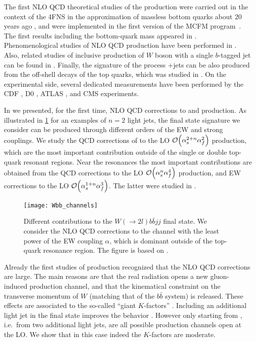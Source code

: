 The first NLO QCD theoretical studies of the \Wbb{} production were carried out in 
the context of the 4FNS in the approximation of massless bottom quarks about 20 years ago \cite{Bern:1997sc,Ellis:1998fv},
and were implemented in the first version of the MCFM program~\cite{mcfm7}.
The first results including the bottom-quark mass appeared in \cite{FebresCordero:2006sj,Cordero:2009kv,Badger:2010mg,Oleari:2011ey}.
Phenomenological studies of NLO QCD \Wbbnj[1]{} production have been performed in \cite{Luisoni:2015mpa}.
Also, related studies of inclusive production of $W$ boson with a single $b$-tagged jet
can be found in \cite{Campbell:2006cu,Campbell:2008hh,Caola:2011pz}.
Finally, the signature of the process \Wbb{}+jets can be also produced from
the off-shell decays of the top quarks, which was studied in \cite{Denner:2017kzu}.
On the experimental side, several dedicated measurements
have been performed by the CDF \cite{Aaltonen:2009qi}, D0 \cite{D0:2012qt}, ATLAS \cite{Aad:2013vka}, and CMS \cite{Chatrchyan:2013uza,CMS:2016bb}
experiments.

In \cite{Anger:2017glm} we presented, for the first time, NLO QCD corrections to \Wbbnj[2]{} and
\Wbbnj[3]{} production. As illustrated in \cref{fig:wbb_channels} for an examples of $n=2$ light jets,
the final state signature we consider can be produced through different orders of the EW and strong couplings.
We study the QCD corrections of to the LO $\order{\alps^{2+n}\alpf^2}$ production,
which are the most important contribution outside of the single or double top-quark resonant regions.
Near the resonances the most important contributions are obtained from the QCD corrections to the LO $\order{\alps^{n}\alpf^4}$ production,
and EW corrections to the LO $\order{\alps^{1+n}\alpf^3}$. The latter were studied in \cite{Denner:2017kzu}.

\begin{figure}[t]
  \centering
  \texttt{[image: Wbb\_channels]}
  \caption{
    Different contributions to the $W(\to 2l)b\bar{b}jj$ final state.
    We consider the NLO QCD corrections to the channel with the least power of the EW coupling $\alpha$, which
    is dominant outside of the top-quark resonance region.
    The figure is based on \cite{Denner:2017kzu}.
  }
  \label{fig:wbb_channels}
\end{figure}


Already the first studies of \Wbb{} production
recognized \cite{Ellis:1998fv,FebresCordero:2006sj,Cordero:2009kv} that the NLO QCD corrections are large. 
The main reasons are that the real radiation opens a new
gluon-induced production channel, and that
the kinematical constraint on the transverse momentum of  $W$ (matching that of the $b\bar{b}$ system) is released.
These effects are associated to the so-called ``giant $K$-factors'' \cite{Rubin:2010xp}. 
Including an additional light jet in the final state improves the  behavior \cite{Luisoni:2015mpa}.
However only starting from \Wbbnj[2]{}, i.e.\ from two additional light jets, are all possible production
channels open at the LO.  We show that in this case indeed the $K$-factors are moderate.


